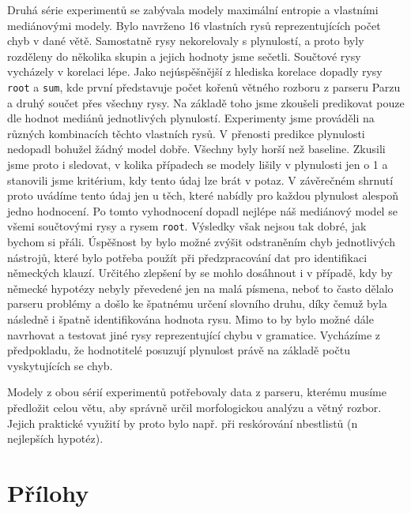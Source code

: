 \documentclass[12pt,a4paper]{report}
\let\openright=\clearpage
\def\chapwithtoc#1{
\chapter*{#1}
\addcontentsline{toc}{chapter}{#1}
}
\begin{document}
Druhá série experimentů se zabývala modely maximální entropie a vlastními mediánovými modely. Bylo navrženo 16 vlastních rysů reprezentujících počet chyb v dané větě. Samostatně rysy nekorelovaly s plynulostí, a proto byly rozděleny do několika skupin a jejich hodnoty jsme sečetli. Součtové rysy vycházely v korelaci lépe. Jako nejúspěšnější z hlediska korelace dopadly rysy \texttt{root} a \texttt{sum}, kde první představuje počet kořenů větného rozboru z parseru Parzu a druhý součet přes všechny rysy. Na základě toho jsme zkoušeli predikovat pouze dle hodnot mediánů jednotlivých plynulostí. Experimenty jsme prováděli na různých kombinacích těchto vlastních rysů. V přenosti predikce plynulosti nedopadl bohužel žádný model dobře. Všechny byly horší než baseline. Zkusili jsme proto i sledovat, v kolika případech se modely lišily v plynulosti jen o 1 a stanovili jsme kritérium, kdy tento údaj lze brát v potaz. V závěrečném shrnutí proto uvádíme tento údaj jen u těch, které nabídly pro každou plynulost alespoň jedno hodnocení. Po tomto vyhodnocení dopadl nejlépe náš mediánový model se všemi součtovými rysy a rysem \texttt{root}. Výsledky však nejsou tak dobré, jak bychom si přáli. Úspěšnost by bylo možné zvýšit odstraněním chyb jednotlivých nástrojů, které bylo potřeba použít při předzpracování dat pro identifikaci německých klauzí. Určitého zlepšení by se mohlo dosáhnout i v případě, kdy by německé hypotézy nebyly převedené jen na malá písmena, neboť to často dělalo parseru problémy a došlo ke špatnému určení slovního druhu, díky čemuž byla následně i špatně identifikována hodnota rysu. Mimo to by bylo možné dále navrhovat a testovat jiné rysy reprezentující chybu v gramatice. Vycházíme z předpokladu, že hodnotitelé posuzují plynulost právě na základě počtu vyskytujících se chyb.

Modely z obou sérií experimentů potřebovaly data z parseru, kterému musíme předložit celou větu, aby správně určil morfologickou analýzu a větný rozbor. Jejich praktické využití by proto bylo např. při reskórování nbestlistů (n nejlepších hypotéz).




\listoffigures
{}



\listoftables
{}

\chapwithtoc{Přílohy}

\openright
\end{document}
